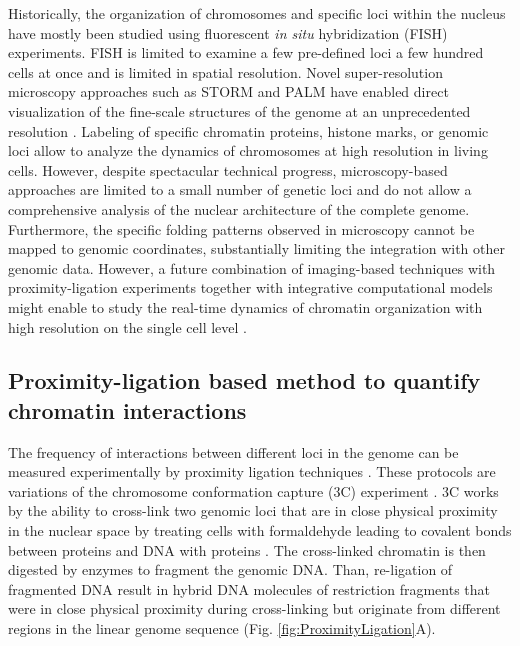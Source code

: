 \documentclass[a4paper,twoside=true,openright,parskip=full,chapterprefix=true,11pt,headings=normal,bibliography=totoc,listof=totoc,titlepage=on,captions=tableabove,draft=false]{scrreprt}
\theoremstyle{definition}
\theoremstyle{definition}
\theoremstyle{definition}
\theoremstyle{remark}
\begin{document}
Historically, the organization of chromosomes and specific loci within
the nucleus have mostly been studied using fluorescent \emph{in situ}
hybridization (FISH) experiments. FISH is limited to examine a few
pre-defined loci a few hundred cells at once and is limited in spatial
resolution. Novel super-resolution microscopy approaches such as STORM
and PALM have enabled direct visualization of the fine-scale structures
of the genome at an unprecedented resolution \citep{Bonev2016}. Labeling
of specific chromatin proteins, histone marks, or genomic loci allow to
analyze the dynamics of chromosomes at high resolution in living cells.
However, despite spectacular technical progress, microscopy-based
approaches are limited to a small number of genetic loci and do not
allow a comprehensive analysis of the nuclear architecture of the
complete genome. Furthermore, the specific folding patterns observed in
microscopy cannot be mapped to genomic coordinates, substantially
limiting the integration with other genomic data. However, a future
combination of imaging-based techniques with proximity-ligation
experiments together with integrative computational models might enable
to study the real-time dynamics of chromatin organization with high
resolution on the single cell level
\citep[\citet{Flyamer2017}]{Stevens2017}.

\hypertarget{proximity-ligation-based-method-to-quantify-chromatin-interactions}{%
\subsection{Proximity-ligation based method to quantify chromatin
interactions}\label{proximity-ligation-based-method-to-quantify-chromatin-interactions}}

The frequency of interactions between different loci in the genome can
be measured experimentally by proximity ligation techniques
\citep{Sati2017, Schmitt2016}. These protocols are variations of the
chromosome conformation capture (3C) experiment \citep{Dekker2002}. 3C
works by the ability to cross-link two genomic loci that are in close
physical proximity in the nuclear space by treating cells with
formaldehyde leading to covalent bonds between proteins and DNA with
proteins \citep{Hoffman2015}. The cross-linked chromatin is then
digested by enzymes to fragment the genomic DNA. Than, re-ligation of
fragmented DNA result in hybrid DNA molecules of restriction fragments
that were in close physical proximity during cross-linking but originate
from different regions in the linear genome sequence
\citep{Dekker2013, Andrey2017} (Fig. \ref{fig:ProximityLigation}A).
\end{document}
